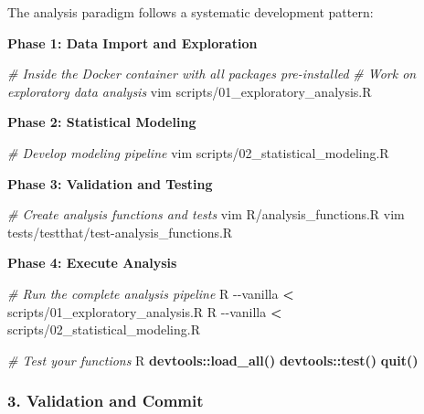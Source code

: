 \documentclass[
]{article}
\newenvironment{Shaded}{\begin{snugshade}}{\end{snugshade}}
\newcommand{\AttributeTok}[1]{\textcolor[rgb]{0.13,0.29,0.53}{#1}}
\newcommand{\CommentTok}[1]{\textcolor[rgb]{0.56,0.35,0.01}{\textit{#1}}}
\newcommand{\ExtensionTok}[1]{#1}
\newcommand{\FunctionTok}[1]{\textcolor[rgb]{0.13,0.29,0.53}{\textbf{#1}}}
\newcommand{\NormalTok}[1]{#1}
\newcommand{\OperatorTok}[1]{\textcolor[rgb]{0.81,0.36,0.00}{\textbf{#1}}}
\begin{document}
The analysis paradigm follows a systematic development pattern:

\textbf{Phase 1: Data Import and Exploration}

\begin{Shaded}
\begin{Highlighting}[]
\CommentTok{\# Inside the Docker container with all packages pre{-}installed}
\CommentTok{\# Work on exploratory data analysis}
\ExtensionTok{vim}\NormalTok{ scripts/01\_exploratory\_analysis.R}
\end{Highlighting}
\end{Shaded}

\textbf{Phase 2: Statistical Modeling}

\begin{Shaded}
\begin{Highlighting}[]
\CommentTok{\# Develop modeling pipeline}
\ExtensionTok{vim}\NormalTok{ scripts/02\_statistical\_modeling.R}
\end{Highlighting}
\end{Shaded}

\textbf{Phase 3: Validation and Testing}

\begin{Shaded}
\begin{Highlighting}[]
\CommentTok{\# Create analysis functions and tests}
\ExtensionTok{vim}\NormalTok{ R/analysis\_functions.R}
\ExtensionTok{vim}\NormalTok{ tests/testthat/test{-}analysis\_functions.R}
\end{Highlighting}
\end{Shaded}

\textbf{Phase 4: Execute Analysis}

\begin{Shaded}
\begin{Highlighting}[]
\CommentTok{\# Run the complete analysis pipeline}
\ExtensionTok{R} \AttributeTok{{-}{-}vanilla} \OperatorTok{\textless{}}\NormalTok{ scripts/01\_exploratory\_analysis.R}
\ExtensionTok{R} \AttributeTok{{-}{-}vanilla} \OperatorTok{\textless{}}\NormalTok{ scripts/02\_statistical\_modeling.R}

\CommentTok{\# Test your functions}
\ExtensionTok{R}
\FunctionTok{devtools::load\_all()}
\FunctionTok{devtools::test()}
\FunctionTok{quit()}
\end{Highlighting}
\end{Shaded}

\subsubsection{3. Validation and Commit}\label{validation-and-commit}
\end{document}
